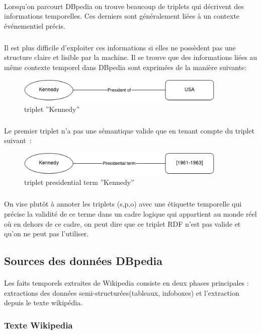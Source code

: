 \paragraph{}
Lorsqu’on parcourt DBpedia on trouve beaucoup de triplets qui décrivent des informations temporelles. Ces derniers sont généralement liées à un contexte événementiel précis.
\subparagraph{}
Il est plus difficile d’exploiter ces informations si elles ne possèdent pas une structure claire et lisible par la machine.
\newline
Il se trouve que des informations liées au même contexte temporel dans DBpedia sont exprimées de la manière suivante: 
\begin{figure}[H]
        \centering
                \centering
                \includegraphics[width=10cm]{ken.png}
               \caption{triplet ''Kennedy''}

\end{figure}
\subparagraph{}
Le premier triplet n'a pas une sémantique valide que en tenant compte du triplet suivant~: 
\begin{figure}[H]
        \centering
                \centering
                \includegraphics[width=10cm]{presidterm.png}
               \caption{triplet presidential term ''Kennedy''}

\end{figure}
\subparagraph{}
On vise plutôt à annoter les triplets (s,p,o) avec une étiquette temporelle qui précise la validité de ce terme dans un cadre logique qui appartient au monde réel où en dehors de ce cadre, on peut dire que ce triplet RDF n’est pas valide et qu’on ne peut pas l’utiliser.
\subsection*{Sources des données DBpedia}
\paragraph{}
Les faits temporels extraites de Wikipedia consiste en deux phases principales : extractions des données semi-structurées(tableaux, infoboxes) et l’extraction depuis le texte wikipédia.
\subsubsection*{Texte Wikipedia}
